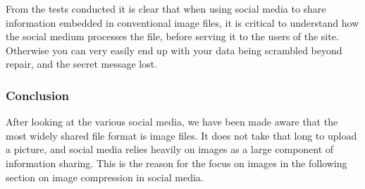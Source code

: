 From the tests conducted it is clear that when using social media to share information embedded in conventional image files, it is critical to understand how the social medium processes the file, before serving it to the users of the site.
Otherwise you can very easily end up with your data being scrambled beyond repair, and the secret message lost.

\subsubsection*{Conclusion}
After looking at the various social media, we have been made aware that the most widely shared file format is image files. 
It does not take that long to upload a picture, and social media relies heavily on images as a large component of information sharing.
This is the reason for the focus on images in the following section on image compression in social media.